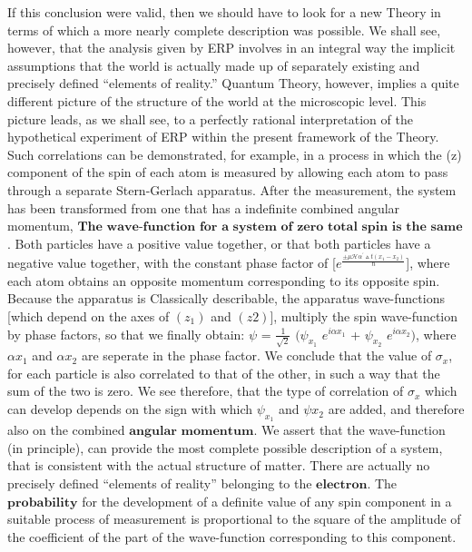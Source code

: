 \documentclass[a4paper, 10pt, onepage]{elegantbook}
\begin{document}
{If this conclusion were valid, then we should have to look for a new Theory in terms of which a more nearly complete description was possible. We shall see, however, that the analysis given by ERP involves in an integral way the implicit assumptions that the world is actually made up of separately existing and precisely defined “elements of reality.” Quantum Theory, however, implies a quite different picture of the structure of the world at the microscopic level. This picture leads, as we shall see, to a perfectly rational interpretation of the hypothetical experiment of ERP within the present framework of the Theory. Such correlations can be demonstrated, for example, in a process in which the (z) component of the spin of each atom is measured by allowing each atom to pass through a separate Stern-Gerlach apparatus. After the measurement, the system has been transformed from one that has a indefinite combined angular momentum, $\mathbf{\textbf{The wave-function for a system of zero total spin is the same}}$. Both particles have a positive value together, or that both particles have a negative value together, with the constant phase factor of [$e^\frac{\pm \mu \mathscr H \alpha^{\prime} \vartriangle t(x_1 - x_2)}{\hbar}$], where each atom obtains an opposite momentum corresponding to its opposite spin. Because the apparatus is Classically describable, the apparatus wave-functions [which depend on the axes of $(z_1)$ and $(z2)$], multiply the spin wave-function by phase factors, so that we finally obtain: $\psi$ = $\frac{1}{\sqrt 2}$ $(\psi_{x_1}$ $e^{i \alpha x_1 }$ + $\psi _{x_2}$ $e^{i \alpha x_2})$, where $\alpha x_1$ and $\alpha x_2$ are seperate in the phase factor. We conclude that the value of $\sigma_x$, for each particle is also correlated to that of the other, in such a way that the sum of the two is zero. We see therefore, that the type of correlation of $\sigma_x$ which can develop depends on the sign with which $\psi_{x_1}$ and $\psi{x_2}$ are added, and therefore also on the combined $\mathbf{\textbf{angular momentum}}$.
We assert that the wave-function (in principle), can provide the most complete possible description of a system,
that is consistent with the actual structure of matter.
There are actually no precisely defined “elements of reality” belonging to the $\mathbf{\textbf{electron}}$.
The $\mathbf{\textbf{probability}}$ for the development of a definite value of any spin component in a suitable process of measurement is proportional to the square of the amplitude of the coefficient of the part of the wave-function corresponding to this component.
}
\end{document}
